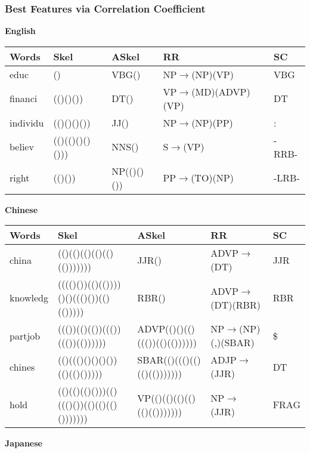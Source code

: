 \begin{frame}
    \frametitle{Best Features via Correlation Coefficient}
    \begin{center}
    {\tiny

    \textbf{English}

    \begin{tabular}{|l|l|l|l|l|}
        \hline
        \textbf{Words} & \textbf{Skel} & \textbf{ASkel} & \textbf{RR }& \textbf{SC }\\
        \hline
        educ     & ()             &  VBG()     &  NP$\rightarrow$(NP)(VP)      &  VBG  \\
        financi  & (()()())       &  DT()      &  VP$\rightarrow$(MD)(ADVP)(VP)&  DT   \\
        individu & (()()()())     &  JJ()      &  NP$\rightarrow$(NP)(PP)      &  :    \\
        believ   & (()(()()()())) &  NNS()     &  S$\rightarrow$(VP)           &  -RRB-\\
        right    & (()())         &  NP(()()())&  PP$\rightarrow$(TO)(NP)      &  -LRB-\\
        \hline
    \end{tabular}

    \vspace{.2in}
    \textbf{Chinese}

    \begin{tabular}{|l|l|l|l|l|}
        \hline
        \textbf{Words} & \textbf{Skel} & \textbf{ASkel} & \textbf{RR }& \textbf{SC }\\
        \hline
        china &  (()(()(()(()(()(()))))))                  & JJR()
        & ADVP$\rightarrow$(DT)       &  JJR \\
        knowledg &  (((()())(()(())))()()((()())(()(())))) &  RBR()
        &  ADVP$\rightarrow$(DT)(RBR)  &  RBR \\
        partjob &  ((())(()(())((())((())(())))))          &
        ADVP(()()(()((())(()(())))))&  NP$\rightarrow$(NP)(,)(SBAR)& \$   \\
        chines &  (()((()()()()())(()(()()))))             &
        SBAR(()((()(()(()(()))))))  &  ADJP$\rightarrow$(JJR)      &  DT  \\
        hold &  (()(()(()()))(()((()())(()(()(()()))))))   &
        VP(()(()(()(()(()(()))))))  &  NP$\rightarrow$(JJR)        &  FRAG\\
        \hline
    \end{tabular}

    \vspace{.2in}
    \textbf{Japanese}

}
\end{center}
\end{frame}
